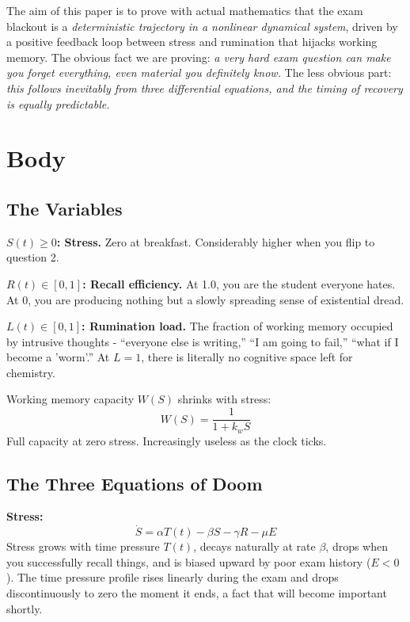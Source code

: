 \documentclass[11pt,a4paper]{article}
\begin{document}
The aim of this paper is to prove with actual mathematics that
the exam blackout is a \emph{deterministic trajectory in a nonlinear
dynamical system}, driven by a positive feedback loop between stress
and rumination that hijacks working memory. The obvious fact we are
proving: \emph{a very hard exam question can make you forget
everything, even material you definitely know.} The less obvious
part: \emph{this follows inevitably from three differential equations,
and the timing of recovery is equally predictable.}

\section{Body}

\subsection{The Variables}

\textbf{$S(t) \geq 0$: Stress.} Zero at breakfast. Considerably
higher when you flip to question 2.

\textbf{$R(t) \in [0,1]$: Recall efficiency.} At 1.0, you are the
student everyone hates. At 0, you are producing nothing but a slowly
spreading sense of existential dread.

\textbf{$L(t) \in [0,1]$: Rumination load.} The fraction of working
memory occupied by intrusive thoughts - ``everyone else is writing,''
``I am going to fail,'' ``what if I become a 'worm'.'' At $L=1$,
there is literally no cognitive space left for chemistry.

Working memory capacity $W(S)$ shrinks with stress:
\begin{equation}
  W(S) = \frac{1}{1 + k_w S}
  \label{eq:W}
\end{equation}
Full capacity at zero stress. Increasingly useless as the clock ticks.

\subsection{The Three Equations of Doom}

\textbf{Stress:}
\begin{equation}
  \dot{S} = \alpha T(t) - \beta S - \gamma R - \mu E
  \label{eq:S}
\end{equation}
Stress grows with time pressure $T(t)$, decays naturally at rate
$\beta$, drops when you successfully recall things, and is biased
upward by poor exam history ($E < 0$). The time pressure profile
rises linearly during the exam and drops discontinuously to zero
the moment it ends, a fact that  will become important shortly.
\end{document}
